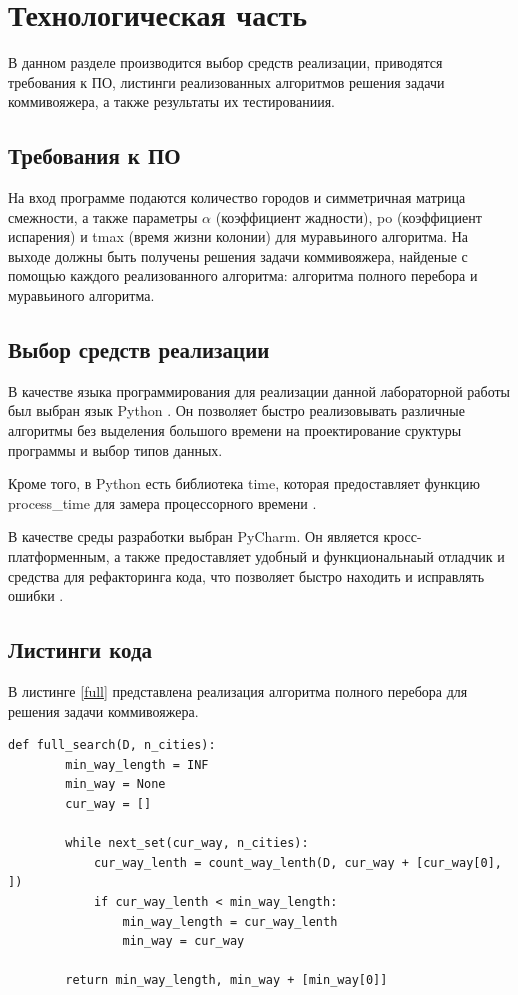 \chapter{Технологическая часть}

В данном разделе производится выбор средств реализации, приводятся требования к ПО, листинги реализованных алгоритмов решения задачи коммивояжера, а также результаты их тестированиия.

\section{Требования к ПО}

На вход программе подаются количество городов и симметричная матрица смежности, а также параметры $\alpha$ (коэффициент жадности), po (коэффициент испарения) и tmax (время жизни колонии) для муравьиного алгоритма. На выходе должны быть получены решения задачи коммивояжера, найденые с помощью каждого реализованного алгоритма: алгоритма полного перебора и муравьиного алгоритма. 

\section{Выбор средств реализации}

В качестве языка программирования для реализации данной лабораторной работы был выбран язык Python  \cite{PythonBook}. Он позволяет быстро реализовывать различные алгоритмы без выделения большого времени на проектирование сруктуры программы и выбор типов данных. 

Кроме того, в Python есть библиотека time, которая предоставляет функцию process\_time для замера процессорного времени \cite{process_time_text}.

В качестве среды разработки выбран PyCharm. Он является кросс-платформенным, а также предоставляет удобный и функциональнаый отладчик и средства для рефакторинга кода, что позволяет быстро находить и исправлять ошибки \cite{pycharm}.

\section{Листинги кода}

В листинге \ref{full} представлена реализация алгоритма полного перебора для решения задачи коммивояжера.

\clearpage
\begin{lstlisting}[caption=Алгоритм полного перебора,
	label={full}]
	def full_search(D, n_cities):
		min_way_length = INF
		min_way = None
		cur_way = []
		
		while next_set(cur_way, n_cities):
			cur_way_lenth = count_way_lenth(D, cur_way + [cur_way[0], ])
			if cur_way_lenth < min_way_length:
				min_way_length = cur_way_lenth
				min_way = cur_way
		
		return min_way_length, min_way + [min_way[0]]
\end{lstlisting}

